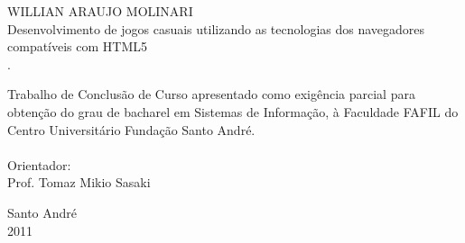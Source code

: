 \thispagestyle{empty}

\vspace{3cm}
\begin{center}
WILLIAN ARAUJO MOLINARI \\
\vspace{3cm}
\huge Desenvolvimento de jogos casuais utilizando as tecnologias dos navegadores compatíveis com HTML5 \\
\vspace{2.5cm}
\large.\\
\hspace{6cm} \begin{minipage}{0.5\textwidth}
Trabalho de Conclusão de Curso apresentado como exigência parcial para
obtenção do grau de bacharel em Sistemas de Informação, à Faculdade
FAFIL do Centro Universitário Fundação Santo André. \\
\\
Orientador: \\
Prof. Tomaz Mikio Sasaki
\end{minipage}
\vspace{5cm}

\large Santo André \\ 2011
\end{center}
